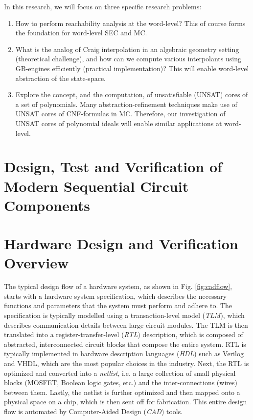In this research, we will focus on three specific research problems: 
\begin{enumerate}
\item How to perform reachability analysis at the word-level? This
  of course forms the foundation for word-level SEC and MC.
\item What is the analog of Craig interpolation in an algebraic
  geometry setting (theoretical challenge), and how can we compute
  various interpolants using GB-engines efficiently (practical
  implementation)? This will enable word-level abstraction of the
  state-space. 
\item Explore the concept, and the computation, of unsatisfiable (UNSAT)
  cores of  a set of polynomials. Many abstraction-refinement
  techniques make use of UNSAT cores of CNF-formulas in MC. Therefore,
  our investigation of UNSAT cores of polynomial ideals will enable
  similar applications at word-level. 
\end{enumerate}


\section{Design, Test and Verification of Modern Sequential Circuit Components}\section{Hardware Design and Verification Overview}
The typical design flow of a hardware system, 
as shown in Fig. \ref{fig:cadflow}, starts with a hardware system 
specification, which describes the necessary functions and parameters that 
the system must perform and adhere to. The specification is typically
modelled using a transaction-level model (\emph{TLM}), which describes 
communication details between large circuit modules. 
The TLM is then translated 
into a register-transfer-level (\emph{RTL}) description, which is composed of abstracted, 
interconnected circuit blocks that compose the entire system. RTL is 
typically implemented 
in hardware description languages (\emph{HDL}) such as Verilog and VHDL, 
which are the most popular choices in the industry.
Next, the RTL is optimized and converted into a \emph{netlist}, i.e. a large 
collection of small physical blocks (MOSFET, Boolean logic gates, etc.) and 
the inter-connections (wires) between them. 
Lastly, the netlist is further optimized and then mapped onto a physical space 
on a chip, which is then sent off for fabrication. This entire design flow
is automated by Computer-Aided Design (\emph{CAD}) tools. 

